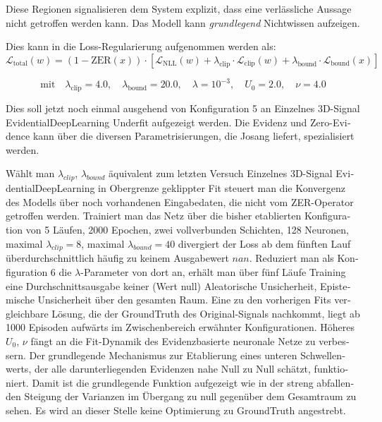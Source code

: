 \begin{otherlanguage}{ngerman}
{Diese Regionen signalisieren dem System explizit, dass eine verlässliche Aussage nicht getroffen werden kann. Das Modell kann \textit{grundlegend} Nichtwissen aufzeigen. 

Dies kann in die Loss-Regularierung aufgenommen werden als: 
\[
\mathcal{L}_{\text{total}}(w) = 
(1 - \text{ZER}(x)) \cdot \left[ 
\mathcal{L}_{\text{NLL}}(w) 
+ \lambda_{\text{clip}} \cdot \mathcal{L}_{\text{clip}}(w) 
+ \lambda_{\text{bound}} \cdot \mathcal{L}_{\text{bound}}(x) 
\right]
\]

\[
\text{mit} \quad 
\lambda_{\text{clip}} = 4.0, \quad
\lambda_{\text{bound}} = 20.0, \quad
\lambda = 10^{-3}, \quad
U_0 = 2.0, \quad
\nu = 4.0
\]

Dies soll jetzt noch einmal ausgehend von Konfiguration 5 an \glqq{}Einzelnes 3D-Signal \gls{EvidentialDeepLearning} Underfit\grqq{} aufgezeigt werden. Die Evidenz und \glqq{}Zero-Evidence\grqq{} kann über die diversen Parametrisierungen, die Josang liefert, spezialisiert werden.  

Wählt man $\lambda_{clip}$, $\lambda_{bound}$ äquivalent zum letzten Versuch \glqq{}Einzelnes 3D-Signal \gls{EvidentialDeepLearning} in Obergrenze geklippter Fit\grqq{} steuert man die Konvergenz des Modells über noch vorhandenen Eingabedaten, die nicht vom ZER-Operator getroffen werden. Trainiert man das Netz über die bisher etablierten Konfiguration von 5 Läufen, 2000 Epochen, zwei vollverbunden Schichten, 128 Neuronen, maximal $\lambda_{clip}=8$, maximal $\lambda_{bound}=40$ divergiert der Loss ab dem fünften Lauf überdurchschnittlich häufig zu keinem Ausgabewert $nan$. Reduziert man als Konfiguration 6 die $\lambda$-Parameter von dort an, erhält man über fünf Läufe Training eine Durchschnittsausgabe keiner (Wert \glqq{}null\grqq{}) \gls{Aleatorische Unsicherheit}, \gls{Epistemische Unsicherheit} über den gesamten Raum. Eine zu den vorherigen Fits vergleichbare Lösung, die der \gls{GroundTruth} des Original-Signals nachkommt, liegt ab 1000 Episoden aufwärts im Zwischenbereich erwähnter Konfigurationen. Höheres $U_{0}$, $\nu$ fängt an die Fit-Dynamik des \gls{Evidenzbasierte neuronale Netze} zu verbessern. Der grundlegende Mechanismus zur Etablierung eines unteren Schwellenwerts, der alle darunterliegenden Evidenzen nahe Null zu Null schätzt, funktioniert. Damit ist die grundlegende Funktion aufgezeigt wie in der streng abfallenden Steigung der Varianzen im Übergang zu null gegenüber dem Gesamtraum zu sehen. Es wird an dieser Stelle keine Optimierung zu \gls{GroundTruth} angestrebt.  



}
\end{otherlanguage}
